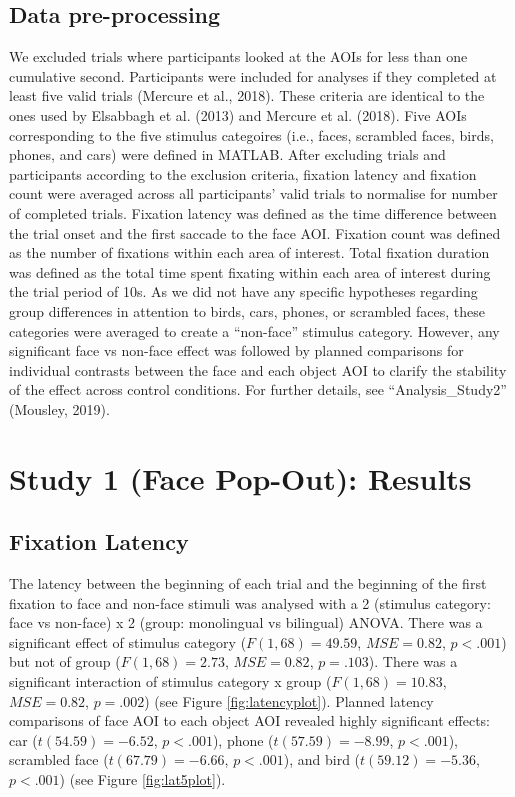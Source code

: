 \documentclass[english,man,floatsintext]{apa6}
\begin{document}
\hypertarget{data-pre-processing}{%
\subsection{Data pre-processing}\label{data-pre-processing}}

We excluded trials where participants looked at the AOIs for less than one cumulative second. Participants were included for analyses if they completed at least five valid trials (Mercure et al., 2018). These criteria are identical to the ones used by Elsabbagh et al. (2013) and Mercure et al. (2018). Five AOIs corresponding to the five stimulus categoires (i.e., faces, scrambled faces, birds, phones, and cars) were defined in MATLAB.
After excluding trials and participants according to the exclusion criteria, fixation latency and fixation count were averaged across all participants' valid trials to normalise for number of completed trials. Fixation latency was defined as the time difference between the trial onset and the first saccade to the face AOI. Fixation count was defined as the number of fixations within each area of interest. Total fixation duration was defined as the total time spent fixating within each area of interest during the trial period of 10s. As we did not have any specific hypotheses regarding group differences in attention to birds, cars, phones, or scrambled faces, these categories were averaged to create a \enquote{non-face} stimulus category. However, any significant face vs non-face effect was followed by planned comparisons for individual contrasts between the face and each object AOI to clarify the stability of the effect across control conditions. For further details, see \enquote{Analysis\_Study2} (Mousley, 2019).

\hypertarget{study-1-face-pop-out-results}{%
\section{Study 1 (Face Pop-Out): Results}\label{study-1-face-pop-out-results}}

\hypertarget{fixation-latency}{%
\subsection{Fixation Latency}\label{fixation-latency}}

The latency between the beginning of each trial and the beginning of the first fixation to face and non-face stimuli was analysed with a 2 (stimulus category: face vs non-face) x 2 (group: monolingual vs bilingual) ANOVA. There was a significant effect of stimulus category (\(F(1, 68) = 49.59\), \(\mathit{MSE} = 0.82\), \(p < .001\)) but not of group (\(F(1, 68) = 2.73\), \(\mathit{MSE} = 0.82\), \(p = .103\)). There was a significant interaction of stimulus category x group (\(F(1, 68) = 10.83\), \(\mathit{MSE} = 0.82\), \(p = .002\)) (see Figure \ref{fig:latencyplot}). Planned latency comparisons of face AOI to each object AOI revealed highly significant effects: car (\(t(54.59) = -6.52\), \(p < .001\)), phone (\(t(57.59) = -8.99\), \(p < .001\)), scrambled face (\(t(67.79) = -6.66\), \(p < .001\)), and bird (\(t(59.12) = -5.36\), \(p < .001\)) (see Figure \ref{fig:lat5plot}).
\end{document}
